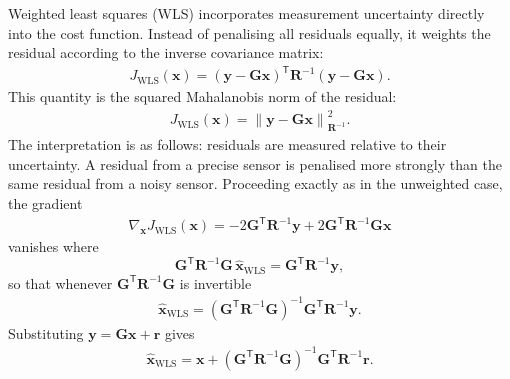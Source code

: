 Weighted least squares (WLS) incorporates measurement uncertainty directly into the cost function. Instead of penalising all residuals equally, it weights the residual according to the inverse covariance matrix:
\begin{align}
J_{\mathrm{WLS}}(\mathbf{x}) = \left( \mathbf{y} - \mathbf{G}\mathbf{x} \right)^{\mathsf T} \mathbf{R}^{-1} \left( \mathbf{y} - \mathbf{G}\mathbf{x} \right).
\end{align}
This quantity is the squared Mahalanobis norm of the residual:
\begin{align}
J_{\mathrm{WLS}}(\mathbf{x}) = \left\| \mathbf{y} - \mathbf{G}\mathbf{x} \right\|_{\mathbf{R}^{-1}}^2.
\end{align}
The interpretation is as follows: residuals are measured relative to their uncertainty. A residual from a precise sensor is penalised more strongly than the same residual from a noisy sensor. 
Proceeding exactly as in the unweighted case, the gradient
\begin{align}
\nabla_{\mathbf{x}}
J_{\mathrm{WLS}}(\mathbf{x}) = -2 \mathbf{G}^{\mathsf T} \mathbf{R}^{-1} \mathbf{y} + 2 \mathbf{G}^{\mathsf T} \mathbf{R}^{-1} \mathbf{G} \mathbf{x}
\end{align}
vanishes where $$\mathbf{G}^{\mathsf T}\mathbf{R}^{-1}\mathbf{G}\,\widehat{\mathbf{x}}_{\mathrm{WLS}}=\mathbf{G}^{\mathsf T}\mathbf{R}^{-1}\mathbf{y},$$ so that whenever $\mathbf{G}^{\mathsf T}\mathbf{R}^{-1}\mathbf{G}$ is invertible
\begin{align}
\widehat{\mathbf{x}}_{\mathrm{WLS}}
=
\left(
\mathbf{G}^{\mathsf T}
\mathbf{R}^{-1}
\mathbf{G}
\right)^{-1}
\mathbf{G}^{\mathsf T}
\mathbf{R}^{-1}
\mathbf{y}.
\end{align}
Substituting $\mathbf{y}=\mathbf{G}\mathbf{x}+\mathbf{r}$ gives
\begin{align}
\widehat{\mathbf{x}}_{\mathrm{WLS}}
=
\mathbf{x}
+
\left(
\mathbf{G}^{\mathsf T}
\mathbf{R}^{-1}
\mathbf{G}
\right)^{-1}
\mathbf{G}^{\mathsf T}
\mathbf{R}^{-1}
\mathbf{r}.
\end{align}
